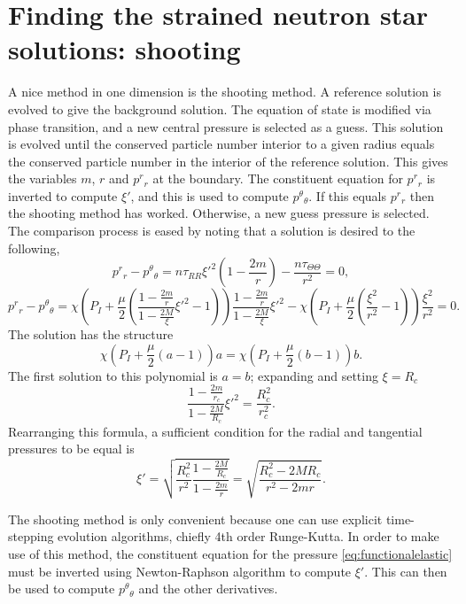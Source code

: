 \section{Finding the strained neutron star solutions: shooting}

A nice method in one dimension is the shooting method. A reference solution is evolved to give the background solution. The equation of state is modified via phase transition, and a new central pressure is selected as a guess. This solution is evolved until the conserved particle number interior to a given radius equals the conserved particle number in the interior of the reference solution. This gives the variables $m$, $r$ and $p^r{}_r$ at the boundary. The constituent equation for $p^r{}_r$ is inverted to compute $\xi'$, and this is used to compute $p^\theta{}_\theta$. If this equals $p^r{}_r$ then the shooting method has worked. Otherwise, a new guess pressure is selected. The comparison process is eased by noting that a solution is desired to the following,
\begin{equation}
p^r{}_r - p^\theta{}_\theta = n\tau_{RR}\xi'^2\left(1 - \frac{2m}{r}\right) - \frac{n\tau_{\Theta\Theta}}{r^2} = 0,
\end{equation}
\begin{equation}
p^r{}_r - p^\theta{}_\theta = \chi\left(P_I + \frac{\mu}{2}\left(\frac{1-\frac{2m}{r}}{1-\frac{2M}{\xi}}\xi'^2 - 1\right)\right)\frac{1-\frac{2m}{r}}{1-\frac{2M}{\xi}}\xi'^2 - \chi\left(P_I + \frac{\mu}{2} \left(\frac{\xi^2}{r^2} - 1\right) \right) \frac{\xi^2}{r^2} = 0.
\end{equation}
The solution has the structure
\begin{equation}
\chi\left(P_I + \frac{\mu}{2}(a - 1)\right)a = \chi\left(P_I + \frac{\mu}{2}(b - 1)\right)b.
\label{eq:rootStructure}
\end{equation}
The first solution to this polynomial is $a=b$; expanding and setting $\xi = R_c$
\begin{equation}
\frac{1-\frac{2m}{r_c}}{1-\frac{2M}{R_c}}\xi'^2 = \frac{R_c^2}{r_c^2}.
\label{eq:aEqualsb1}
\end{equation}
Rearranging this formula, a sufficient condition for the radial and tangential pressures to be equal is
\begin{equation}
\xi' = \sqrt{\frac{R_c^2}{r^2}\frac{1-\frac{2M}{R_c}}{1-\frac{2m}{r}}} = \sqrt{\frac{R_c^2-2M R_c}{r^2 - 2 m r}}.
\end{equation}


The shooting method is only convenient because one can use explicit time-stepping evolution algorithms, chiefly 4th order Runge-Kutta. In order to make use of this method, the constituent equation for the pressure \eqref{eq:functionalelastic} must be inverted using Newton-Raphson algorithm to compute $\xi'$. This can then be used to compute $p^\theta{}_\theta$ and the other derivatives.

